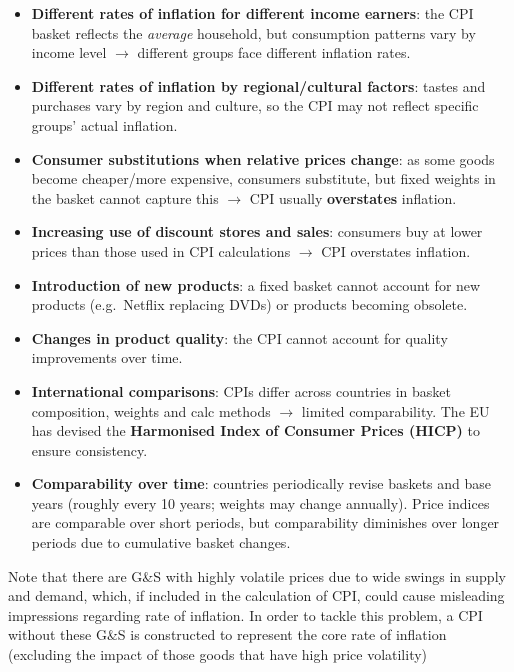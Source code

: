 \documentclass[a4paper,12pt]{article}
\begin{document}
\begin{itemize}
  \item \textbf{Different rates of inflation for different income earners}: the CPI basket reflects the \textit{average} household, but consumption patterns vary by income level $\to$ different groups face different inflation rates.
  \item \textbf{Different rates of inflation by regional/cultural factors}: tastes and purchases vary by region and culture, so the CPI may not reflect specific groups' actual inflation.
  \item \textbf{Consumer substitutions when relative prices change}: as some goods become cheaper/more expensive, consumers substitute, but fixed weights in the basket cannot capture this $\to$ CPI usually \textbf{overstates} inflation.
  \item \textbf{Increasing use of discount stores and sales}: consumers buy at lower prices than those used in CPI calculations $\to$ CPI overstates inflation.
  \item \textbf{Introduction of new products}: a fixed basket cannot account for new products (e.g.\ Netflix replacing DVDs) or products becoming obsolete.
  \item \textbf{Changes in product quality}: the CPI cannot account for quality improvements over time.
  \item \textbf{International comparisons}: CPIs differ across countries in basket composition, weights and calc methods $\to$ limited comparability. The EU has devised the \textbf{Harmonised Index of Consumer Prices (HICP)} to ensure consistency.
  \item \textbf{Comparability over time}: countries periodically revise baskets and base years (roughly every 10 years; weights may change annually). Price indices are comparable over short periods, but comparability diminishes over longer periods due to cumulative basket changes.
\end{itemize}
Note that there are G\&S with highly volatile prices due to wide swings in supply and demand, which, if included in the calculation of CPI, could cause misleading impressions regarding rate of inflation. In order to tackle this problem, a CPI without these G\&S is constructed to represent the core rate of inflation (excluding the impact of those goods that have high price volatility)\\\\
\end{document}
